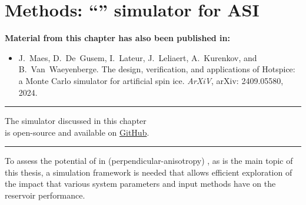 \chapter{Methods: ``\hotspice'' simulator for ASI}\label{ch:Hotspice}

\begin{adjustwidth}{2em}{2em} %
    \begin{center}
        \textbf{Material from this chapter has also been published in:} \\
    \end{center}
    \vspace{1em}
    \begin{adjustwidth}{0em}{3em}
	    \begin{itemize}
	    	\item[\cite{MAES-24}] J.~Maes, D.~De~Gusem, I.~Lateur, J.~Leliaert, A.~Kurenkov, and B.~Van~Waeyenberge.
	    	\newblock The design, verification, and applications of Hotspice: a Monte Carlo simulator for artificial spin ice.
	    	\newblock \emph{ArXiV}, arXiv: 2409.05580, 2024.
	    \end{itemize}
    \end{adjustwidth}
    \vspace{0.5em}
    \begin{center}
        \centering\rule{0.7\linewidth}{0.4pt}
    \end{center}
    \vspace{.5em}
    \begin{center}
    	The \hotspice simulator discussed in this chapter\\
    	is open-source and available on \href{https://github.com/bvwaeyen/Hotspice}{GitHub}. \\
    \end{center}
    \begin{center}
    \centering\rule{0.7\linewidth}{0.4pt}
    \end{center}
    \vspace{1em}
\end{adjustwidth}

To assess the potential of  in (perpendicular-anisotropy) , as is the main topic of this thesis, a simulation framework is needed that allows efficient exploration of the impact that various system parameters and input methods have on the reservoir performance. \\\par

